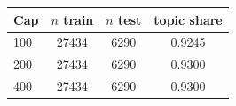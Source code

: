 \begin{tabular}{lccc}
\toprule
Cap & $n$ train & $n$ test & topic share \\
\midrule
100 & 27434 & 6290 & 0.9245 \\
200 & 27434 & 6290 & 0.9300 \\
400 & 27434 & 6290 & 0.9300 \\
\bottomrule
\end{tabular}
